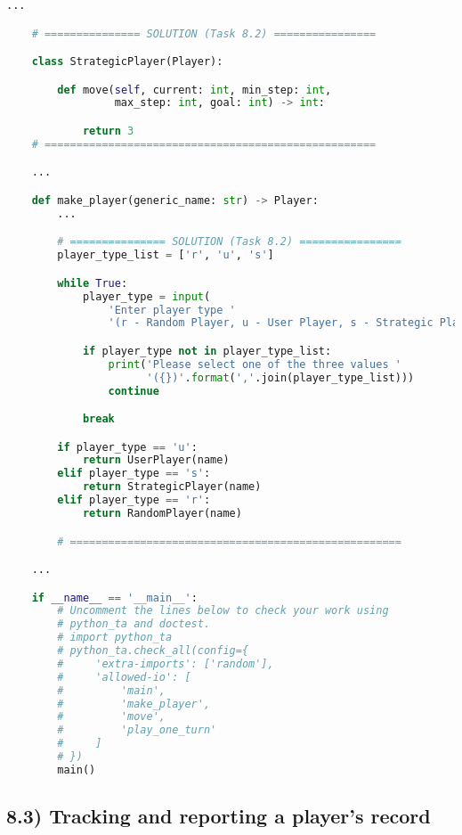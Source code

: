 \documentclass[12pt]{article}
\begin{document}
\begin{lstlisting}[language=Python]
    ...

    # =============== SOLUTION (Task 8.2) ================

    class StrategicPlayer(Player):

        def move(self, current: int, min_step: int,
                 max_step: int, goal: int) -> int:

            return 3
    # ====================================================

    ...

    def make_player(generic_name: str) -> Player:
        ...

        # =============== SOLUTION (Task 8.2) ================
        player_type_list = ['r', 'u', 's']

        while True:
            player_type = input(
                'Enter player type '
                '(r - Random Player, u - User Player, s - Strategic Player)')

            if player_type not in player_type_list:
                print('Please select one of the three values '
                      '({})'.format(','.join(player_type_list)))
                continue

            break

        if player_type == 'u':
            return UserPlayer(name)
        elif player_type == 's':
            return StrategicPlayer(name)
        elif player_type == 'r':
            return RandomPlayer(name)

        # ====================================================

    ...

    if __name__ == '__main__':
        # Uncomment the lines below to check your work using
        # python_ta and doctest.
        # import python_ta
        # python_ta.check_all(config={
        #     'extra-imports': ['random'],
        #     'allowed-io': [
        #         'main',
        #         'make_player',
        #         'move',
        #         'play_one_turn'
        #     ]
        # })
        main()
\end{lstlisting}

\subsection*{8.3) Tracking and reporting a player’s record}
\end{document}
